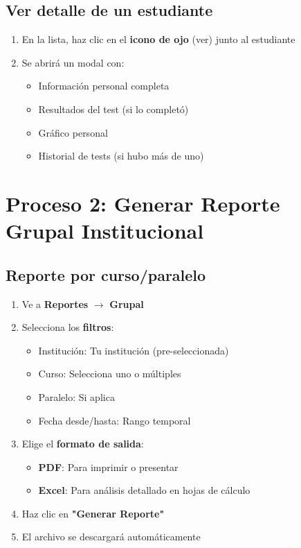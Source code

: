 \documentclass[12pt, a4paper]{report}
\begin{document}
\subsection{Ver detalle de un estudiante}
\begin{enumerate}
    \item En la lista, haz clic en el \textbf{icono de ojo} (ver) junto al estudiante
    \item Se abrirá un modal con:
    \begin{itemize}
        \item Información personal completa
        \item Resultados del test (si lo completó)
        \item Gráfico personal
        \item Historial de tests (si hubo más de uno)
    \end{itemize}
\end{enumerate}

\section{Proceso 2: Generar Reporte Grupal Institucional}

\subsection{Reporte por curso/paralelo}
\begin{enumerate}
    \item Ve a \textbf{Reportes} $\rightarrow$ \textbf{Grupal}
    \item Selecciona los \textbf{filtros}:
    \begin{itemize}
        \item Institución: Tu institución (pre-seleccionada)
        \item Curso: Selecciona uno o múltiples
        \item Paralelo: Si aplica
        \item Fecha desde/hasta: Rango temporal
    \end{itemize}
    \item Elige el \textbf{formato de salida}:
    \begin{itemize}
        \item \textbf{PDF}: Para imprimir o presentar
        \item \textbf{Excel}: Para análisis detallado en hojas de cálculo
    \end{itemize}
    \item Haz clic en \textbf{"Generar Reporte"}
    \item El archivo se descargará automáticamente
\end{enumerate}
\end{document}
